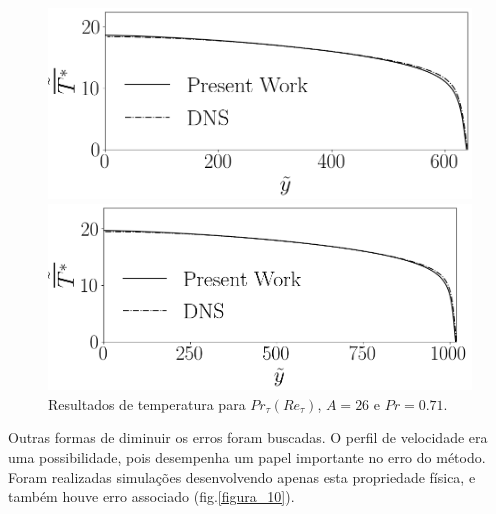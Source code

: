 \begin{figure}[!h]
\begin{minipage}[t]{0.45\textwidth}
	\end{minipage}
	\begin{minipage}[t]{0.5\textwidth}
		\centering
		\includegraphics[angle=0, scale=0.34]{fotos_formatacao_final/Temperature_640_071_Prt(Ret)_A26}
	\end{minipage}
	\begin{minipage}[t]{0.45\textwidth}
		\centering
		\includegraphics[angle=0, scale=0.34]{fotos_formatacao_final/Temperature_1000_071_Prt(Ret)_A26}
	\end{minipage}	
	\caption{Resultados de temperatura para $Pr_\tau(Re_\tau)$, $A = 26$ e $Pr =0.71$. }
	\label{figura_9}
\end{figure}

Outras formas de diminuir os erros foram buscadas. O perfil de velocidade era uma possibilidade, pois desempenha um papel importante no erro do método. Foram realizadas simulações desenvolvendo apenas esta propriedade física, e também houve erro associado (fig.\ref{figura_10}).

